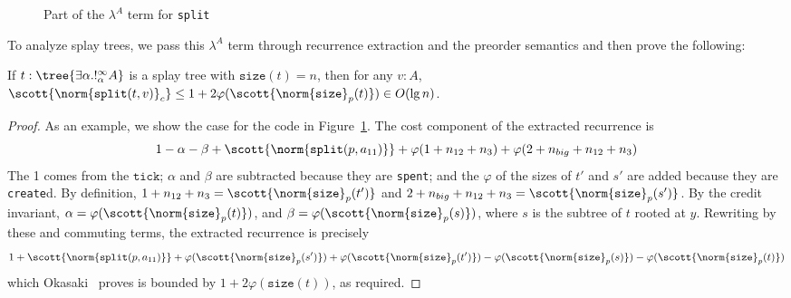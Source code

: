 \begin{figure}
  \vspace{-0.1in}
  
  \vspace{-0.3in}
  \caption{Part of the $\lambda^A$ term for \texttt{split}}
    \vspace{-0.1in}
  \label{fig:split}
\end{figure}

To analyze splay trees, we pass this $\lambda^A$ term through recurrence extraction and the preorder semantics and then prove the following:
\begin{theorem}
If $t : \tree {\exists \alpha . !^\infty_\alpha A}$ is a splay tree with $\texttt{size}(t) = n$, then for any $v : A$, $\scott{\norm{\texttt{split}(t,v)}_c} \leq 1 + 2\varphi(\scott{\norm{\texttt{size}}_p(t)}) \in O(\lg n)$.
\end{theorem}
\begin{proof}
As an example, we show the case for the code in Figure~\ref{fig:split}. The cost component of the extracted recurrence is
\[
1-\alpha - \beta + \scott{\norm{\texttt{split}(p,a_{11})}} + \varphi(1 + n_{12} + n_3) + \varphi(2 + n_{big} + n_{12} + n_3)
\]
The 1 comes from the $\texttt{tick}$; $\alpha$ and $\beta$ are subtracted because they are \texttt{spent}; and the $\varphi$ of the sizes of $t'$ and $s'$ are added because they are \texttt{create}d.  
By definition, $1 + n_{12} + n_3 = \scott{\norm{\texttt{size}}_p(t')}$ and $2 + n_{big} + n_{12} + n_3 = \scott{\norm{\texttt{size}}_p(s')}$. By the credit invariant, $\alpha = \varphi(\scott{\norm{\texttt{size}}_p(t)})$, and $\beta = \varphi(\scott{\norm{\texttt{size}}_p(s)})$, where $s$ is the subtree of $t$ rooted at $y$. Rewriting by these and commuting terms, the extracted recurrence is precisely
\[1 + \scott{\norm{\texttt{split}(p,a_{11})}} + \varphi(\scott{\norm{\texttt{size}}_p(s')}) + \varphi(\scott{\norm{\texttt{size}}_p(t')}) - \varphi(\scott{\norm{\texttt{size}}_p(s)}) - \varphi(\scott{\norm{\texttt{size}}_p(t)})
\]
which Okasaki~\cite[Theorem 5.2]{okasaki:purely-functional-data-structures} proves is bounded by $1 + 2\varphi(\texttt{size}(t))$, as required.
\end{proof}

